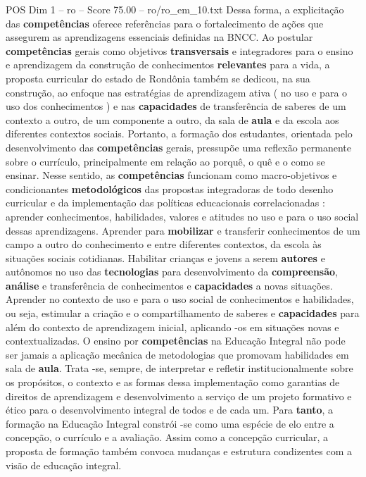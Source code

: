 \begin{textsample}{POS Dim 1 – ro – Score 75.00 – ro/ro\_em\_10.txt}
Dessa forma, a explicitação das \textbf{competências} oferece referências para o fortalecimento de ações que assegurem as aprendizagens essenciais definidas na BNCC.
Ao postular \textbf{competências} gerais como objetivos \textbf{transversais} e integradores para o ensino e aprendizagem da construção de conhecimentos \textbf{relevantes} para a vida, a proposta curricular do estado de Rondônia também se dedicou, na sua construção, ao enfoque nas estratégias de aprendizagem ativa ( no uso e para o uso dos conhecimentos ) e nas \textbf{capacidades} de transferência de saberes de um contexto a outro, de um componente a outro, da sala de \textbf{aula} e da escola aos diferentes contextos sociais.
Portanto, a formação dos estudantes, orientada pelo desenvolvimento das \textbf{competências} gerais, pressupõe uma reflexão permanente sobre o currículo, principalmente em relação ao porquê, o quê e o como se ensinar.
Nesse sentido, as \textbf{competências} funcionam como macro-objetivos e condicionantes \textbf{metodológicos} das propostas integradoras de todo desenho curricular e da implementação das políticas educacionais correlacionadas : aprender conhecimentos, habilidades, valores e atitudes no uso e para o uso social dessas aprendizagens.
Aprender para \textbf{mobilizar} e transferir conhecimentos de um campo a outro do conhecimento e entre diferentes contextos, da escola às situações sociais cotidianas.
Habilitar crianças e jovens a serem \textbf{autores} e autônomos no uso das \textbf{tecnologias} para desenvolvimento da \textbf{compreensão}, \textbf{análise} e transferência de conhecimentos e \textbf{capacidades} a novas situações.
Aprender no contexto de uso e para o uso social de conhecimentos e habilidades, ou seja, estimular a criação e o compartilhamento de saberes e \textbf{capacidades} para além do contexto de aprendizagem inicial, aplicando -os em situações novas e contextualizadas.
O ensino por \textbf{competências} na Educação Integral não pode ser jamais a aplicação mecânica de metodologias que promovam habilidades em sala de \textbf{aula}.
Trata -se, sempre, de interpretar e refletir institucionalmente sobre os propósitos, o contexto e as formas dessa implementação como garantias de direitos de aprendizagem e desenvolvimento a serviço de um projeto formativo e ético para o desenvolvimento integral de todos e de cada um.
Para \textbf{tanto}, a formação na Educação Integral constrói -se como uma espécie de elo entre a concepção, o currículo e a avaliação.
Assim como a concepção curricular, a proposta de formação também convoca mudanças e estrutura condizentes com a visão de educação integral.

\end{textsample}
